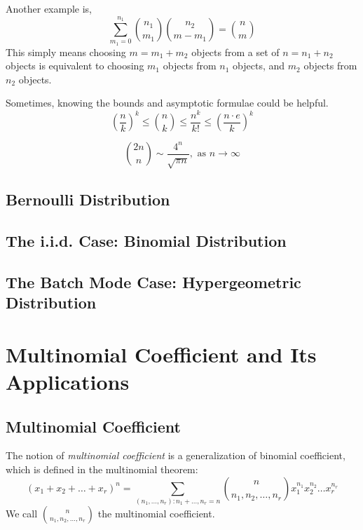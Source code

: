 Another example is,
\begin{equation}
	\sum^{n_1}_{m_1=0} {n_1 \choose m_1} {n_2 \choose m-m_1} = {n \choose m}
\end{equation}
This simply means choosing $m=m_1+m_2$ objects from a set of $n=n_1+n_2$ objects is equivalent to choosing $m_1$ objects from $n_1$ objects, and $m_2$ objects from $n_2$ objects.

Sometimes, knowing the bounds and asymptotic formulae could be helpful.
\begin{equation}
	\left(\frac{n}{k}\right)^k \le {n \choose k} \le {\frac{n^k}{k!}} \le \left(\frac{n \cdot e}{k}\right)^k
\end{equation}

\begin{equation}
	{2n \choose n} \sim \frac{4^n}{\sqrt{\pi n}}, \mbox{ as } n \rightarrow \infty
\end{equation}

\subsection{Bernoulli Distribution}
\subsection{The i.i.d. Case: Binomial Distribution}
\subsection{The Batch Mode Case: Hypergeometric Distribution}



\section{Multinomial Coefficient and Its Applications}

\subsection{Multinomial Coefficient}
The notion of {\em{multinomial coefficient}} is a generalization of binomial coefficient, which is defined in the multinomial theorem:
\begin{equation*}
	(x_1+x_2+\ldots+x_r)^n = \sum_{(n_1,\ldots,n_r):n_1+\ldots,n_r=n} {n \choose n_1,n_2,\ldots,n_r}x_1^{n_1}x_2^{n_2} \ldots x_r^{n_r}
\end{equation*}
We call $n \choose n_1,n_2,\ldots,n_r$ the multinomial coefficient.

